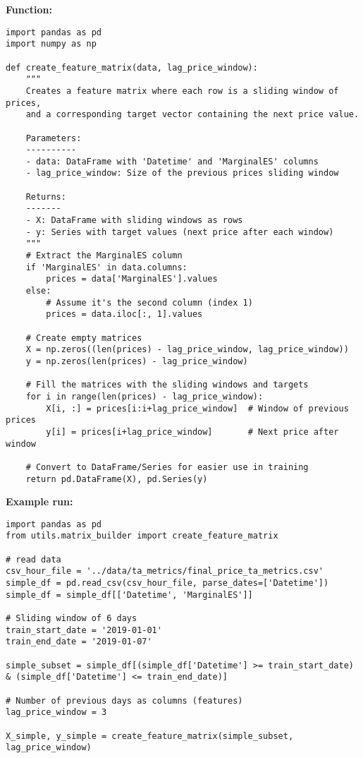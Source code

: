 \documentclass[12pt]{report} %
\begin{document}
\noindent \textbf{Function:}
\begin{lstlisting}
import pandas as pd
import numpy as np

def create_feature_matrix(data, lag_price_window):
    """
    Creates a feature matrix where each row is a sliding window of prices,
    and a corresponding target vector containing the next price value.
    
    Parameters:
    ----------
    - data: DataFrame with 'Datetime' and 'MarginalES' columns
    - lag_price_window: Size of the previous prices sliding window
    
    Returns:
    -------
    - X: DataFrame with sliding windows as rows
    - y: Series with target values (next price after each window)
    """
    # Extract the MarginalES column
    if 'MarginalES' in data.columns:
        prices = data['MarginalES'].values
    else:
        # Assume it's the second column (index 1)
        prices = data.iloc[:, 1].values
    
    # Create empty matrices
    X = np.zeros((len(prices) - lag_price_window, lag_price_window))
    y = np.zeros(len(prices) - lag_price_window)
    
    # Fill the matrices with the sliding windows and targets
    for i in range(len(prices) - lag_price_window):
        X[i, :] = prices[i:i+lag_price_window]  # Window of previous prices
        y[i] = prices[i+lag_price_window]       # Next price after window
    
    # Convert to DataFrame/Series for easier use in training
    return pd.DataFrame(X), pd.Series(y)
\end{lstlisting}

\noindent \textbf{Example run:}
\begin{lstlisting}
import pandas as pd
from utils.matrix_builder import create_feature_matrix

# read data
csv_hour_file = '../data/ta_metrics/final_price_ta_metrics.csv'
simple_df = pd.read_csv(csv_hour_file, parse_dates=['Datetime'])
simple_df = simple_df[['Datetime', 'MarginalES']]

# Sliding window of 6 days
train_start_date = '2019-01-01'
train_end_date = '2019-01-07'

simple_subset = simple_df[(simple_df['Datetime'] >= train_start_date) & (simple_df['Datetime'] <= train_end_date)]

# Number of previous days as columns (features)
lag_price_window = 3

X_simple, y_simple = create_feature_matrix(simple_subset, lag_price_window)
\end{lstlisting}
\end{document}
